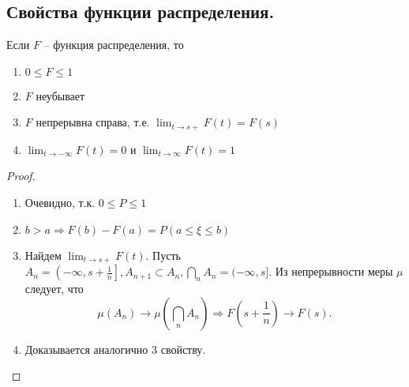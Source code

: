 \subsection{Свойства функции распределения.}
\begin{theorem}
    Если $F$ -- функция распределения, то
    \begin{enumerate}
        \item $0 \leqslant F \leqslant 1$
        \item $F$ неубывает
        \item $F$ непрерывна справа, т.е. $\lim_{t \to s+} F(t) = F(s)$
        \item $\lim_{t \to -\infty} F(t) = 0$ и $\lim_{t \to \infty} F(t) = 1$
    \end{enumerate}
    \begin{proof}
        \text{}
        \begin{enumerate}
            \item Очевидно, т.к. $0 \leqslant P \leqslant 1$
            \item $b > a \Rightarrow F(b) - F(a) = P(a \leqslant \xi \leqslant b)$
            \item Найдем $\lim_{t \to s+} F(t)$. Пусть
            $
                A_n = \left( -\infty, s + \frac{1}{n} \right], A_{n+1} \subset A_n, \bigcap_n A_n  = (-\infty, s].
            $
            Из непрерывности меры $\mu$ следует, что
            \[
                \mu(A_n) \to \mu \left( \bigcap_n A_n \right)
                \Rightarrow
                F \left( s + \frac{1}{n} \right) \to F(s).
            \]
            \item Доказывается аналогично 3 свойству.
        \end{enumerate}
    \end{proof}
\end{theorem}